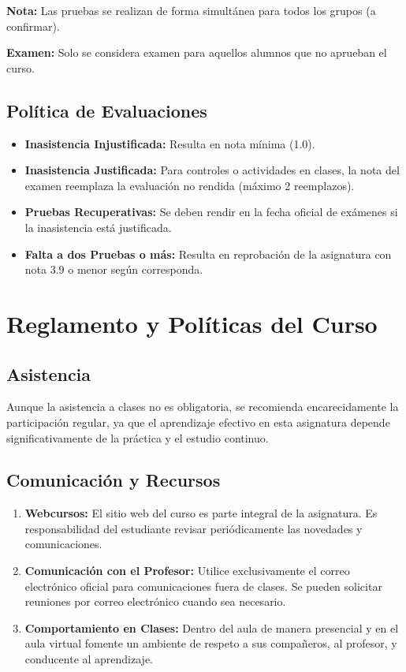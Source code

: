 \documentclass[12pt,a4paper]{article}
\begin{document}
\textbf{Nota:} Las pruebas se realizan de forma simultánea para todos los grupos (a confirmar).

\textbf{Examen:} Solo se considera examen para aquellos alumnos que no aprueban el curso.


\subsection*{Política de Evaluaciones}
\begin{itemize}
\item \textbf{Inasistencia Injustificada:} Resulta en nota mínima (1.0).
\item \textbf{Inasistencia Justificada:} Para controles o actividades en clases, la nota del examen reemplaza la evaluación no rendida (máximo 2 reemplazos).
\item \textbf{Pruebas Recuperativas:} Se deben rendir en la fecha oficial de exámenes si la inasistencia está justificada.
\item \textbf{Falta a dos Pruebas o más:} Resulta en reprobación de la asignatura con nota 3.9 o menor según corresponda.
\end{itemize}


\section*{Reglamento y Políticas del Curso}


\subsection*{Asistencia}
Aunque la asistencia a clases no es obligatoria, se recomienda encarecidamente la participación regular, ya que el aprendizaje efectivo en esta asignatura depende significativamente de la práctica y el estudio continuo.

\subsection*{Comunicación y Recursos}
\begin{enumerate}
\item \textbf{Webcursos:} El sitio web del curso es parte integral de la asignatura. Es responsabilidad del estudiante revisar periódicamente las novedades y comunicaciones.

\item \textbf{Comunicación con el Profesor:} Utilice exclusivamente el correo electrónico oficial para comunicaciones fuera de clases. Se pueden solicitar reuniones por correo electrónico cuando sea necesario.

\item \textbf{Comportamiento en Clases:} Dentro del aula de manera presencial y en el aula virtual fomente un ambiente de respeto a sus compañeros, al profesor, y conducente al aprendizaje.

\end{enumerate}
\end{document}
